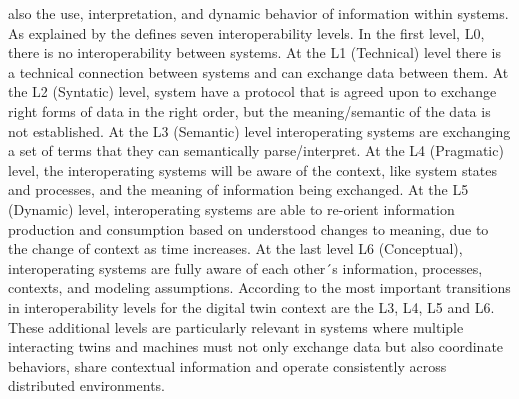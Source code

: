 also the use, interpretation, and dynamic behavior of information within systems. As explained by  the \LCIM 
defines seven interoperability levels. In the first level, L0, there is no interoperability between systems. At the L1 (Technical) 
level there is a technical connection between systems and can exchange data between them. At the L2 (Syntatic) level, system have a 
protocol that is agreed upon to exchange right forms of data in the right order, but the meaning/semantic of the data is not 
established. At the L3 (Semantic) level interoperating systems are exchanging a set of terms that they can semantically 
parse/interpret. At the L4 (Pragmatic) level, the interoperating systems will be aware of the context, like system states and 
processes, and the meaning of information being exchanged. At the L5 (Dynamic) level, interoperating systems are able to re-orient 
information production and consumption based on understood changes to meaning, due to the change of context as time increases. 
At the last level L6 (Conceptual), interoperating systems are fully aware of each other´s information, processes, contexts, and 
modeling assumptions. According to  the most important transitions in interoperability levels for the digital 
twin context are the L3, L4, L5 and L6. These additional levels are particularly relevant in \DT systems where multiple interacting 
twins and machines must not only exchange data but also coordinate behaviors, share contextual information and operate consistently 
across distributed environments.

